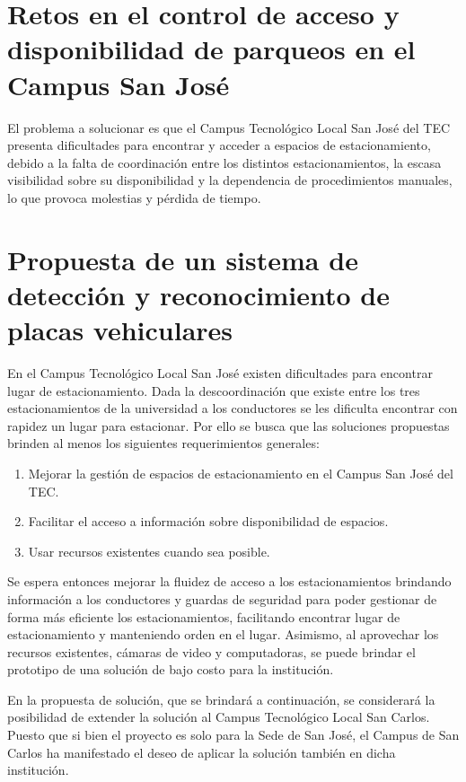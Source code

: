 \section{Retos en el control de acceso y disponibilidad de parqueos en el Campus San José}

El problema a solucionar es que el Campus Tecnológico Local San José del TEC presenta dificultades
para encontrar y acceder a espacios de estacionamiento, debido a la falta de coordinación entre
los distintos estacionamientos, la escasa visibilidad sobre su disponibilidad y la dependencia
de procedimientos manuales, lo que provoca molestias y pérdida de tiempo.

\section{Propuesta de un sistema de detección y reconocimiento de placas vehiculares}

En el Campus Tecnológico Local San José existen dificultades para encontrar
lugar de estacionamiento. Dada la descoordinación que existe entre los tres estacionamientos
de la universidad a los conductores se les dificulta encontrar con rapidez un lugar para estacionar.
Por ello se busca que las soluciones propuestas brinden al menos los siguientes requerimientos generales:

\begin{enumerate}
	\item Mejorar la gestión de espacios de estacionamiento en el Campus San José del TEC.
    \item Facilitar el acceso a información sobre disponibilidad de espacios.
	\item Usar recursos existentes cuando sea posible.
\end{enumerate}

Se espera entonces mejorar la fluidez de acceso a los estacionamientos brindando información a 
los conductores y guardas de seguridad para poder gestionar de forma más eficiente los estacionamientos,
facilitando encontrar lugar de estacionamiento y manteniendo orden en el lugar.
Asimismo, al aprovechar los recursos existentes, cámaras de video y computadoras, se puede brindar el 
prototipo de una solución de bajo costo para la institución.

En la propuesta de solución, que se brindará a continuación, se considerará la posibilidad de
extender la solución al Campus Tecnológico Local San Carlos.
Puesto que si bien el proyecto es solo para la Sede de San José, el Campus de San Carlos
ha manifestado el deseo de aplicar la solución también en dicha institución.

